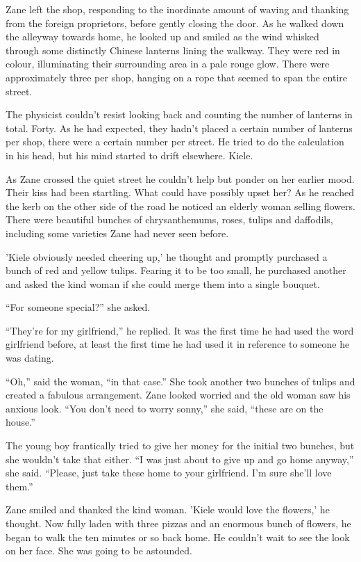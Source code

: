 Zane left the shop, responding to the inordinate amount of waving and thanking from the foreign proprietors, before gently closing the door.  As he walked down the alleyway towards home, he looked up and smiled as the wind whisked through some distinctly Chinese lanterns lining the walkway.  They were red in colour, illuminating their surrounding area in a pale rouge glow.  There were approximately three per shop, hanging on a rope that seemed to span the entire street.  

The physicist couldn't resist looking back and counting the number of lanterns in total.  Forty.  As he had expected, they hadn't placed a certain number of lanterns per shop, there were a certain number per street.  He tried to do the calculation in his head, but his mind started to drift elsewhere.  Kiele.

As Zane crossed the quiet street he couldn't help but ponder on her earlier mood.  Their kiss had been startling.  What could have possibly upset her?  As he reached the kerb on the other side of the road he noticed an elderly woman selling flowers.  There were beautiful bunches of chrysanthemums, roses, tulips and daffodils, including some varieties Zane had never seen before.

'Kiele obviously needed cheering up,' he thought and promptly purchased a bunch of red and yellow tulips.  Fearing it to be too small, he purchased another and asked the kind woman if she could merge them into a single bouquet.

``For someone special?'' she asked.

``They're for my girlfriend,'' he replied.  It was the first time he had used the word girlfriend before, at least the first time he had used it in reference to someone he was dating.  

``Oh,'' said the woman, ``in that case.''  She took another two bunches of tulips and created a fabulous arrangement.  Zane looked worried and the old woman saw his anxious look.  ``You don't need to worry sonny,'' she said, ``these are on the house.''  

The young boy frantically tried to give her money for the initial two bunches, but she wouldn't take that either.  ``I was just about to give up and go home anyway,'' she said.  ``Please, just take these home to your girlfriend.  I'm sure she'll love them.''

Zane smiled and thanked the kind woman.  'Kiele would love the flowers,' he thought.  Now fully laden with three pizzas and an enormous bunch of flowers, he began to walk the ten minutes or so back home.  He couldn't wait to see the look on her face.  She was going to be astounded.

